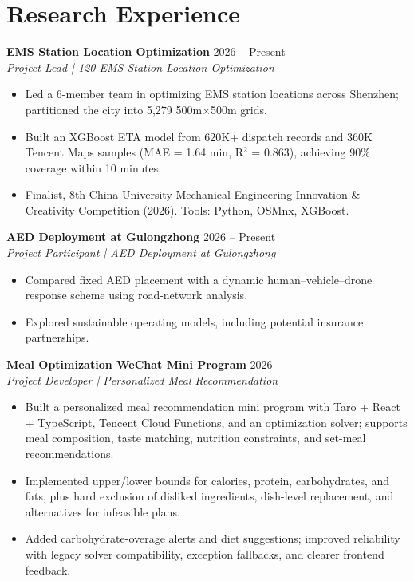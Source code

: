 \documentclass[10pt,a4paper]{article}
\begin{document}
\section{Research Experience}
\textbf{EMS Station Location Optimization} \hfill 2026 -- Present\\
\textit{Project Lead | 120 EMS Station Location Optimization}
\begin{itemize}[label=\textbullet,leftmargin=1.25em,noitemsep,topsep=1pt]
    \item Led a 6-member team in optimizing EMS station locations across Shenzhen; partitioned the city into 5,279 500m$\times$500m grids.
    \item Built an XGBoost ETA model from 620K+ dispatch records and 360K Tencent Maps samples (MAE = 1.64 min, R$^2$ = 0.863), achieving 90\% coverage within 10 minutes.
    \item Finalist, 8th China University Mechanical Engineering Innovation \& Creativity Competition (2026). Tools: Python, OSMnx, XGBoost.
\end{itemize}
\textbf{AED Deployment at Gulongzhong} \hfill 2026 -- Present\\
\textit{Project Participant | AED Deployment at Gulongzhong}
\begin{itemize}[label=\textbullet,leftmargin=1.25em,noitemsep,topsep=1pt]
    \item Compared fixed AED placement with a dynamic human--vehicle--drone response scheme using road-network analysis.
    \item Explored sustainable operating models, including potential insurance partnerships.
\end{itemize}
\textbf{Meal Optimization WeChat Mini Program} \hfill 2026\\
\textit{Project Developer | Personalized Meal Recommendation}
\begin{itemize}[label=\textbullet,leftmargin=1.25em,noitemsep,topsep=1pt]
    \item Built a personalized meal recommendation mini program with Taro + React + TypeScript, Tencent Cloud Functions, and an optimization solver; supports meal composition, taste matching, nutrition constraints, and set-meal recommendations.
    \item Implemented upper/lower bounds for calories, protein, carbohydrates, and fats, plus hard exclusion of disliked ingredients, dish-level replacement, and alternatives for infeasible plans.
    \item Added carbohydrate-overage alerts and diet suggestions; improved reliability with legacy solver compatibility, exception fallbacks, and clearer frontend feedback.
\end{itemize}
\end{document}
